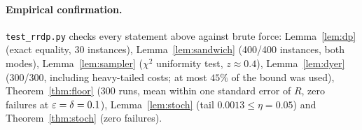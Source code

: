 \paragraph{Empirical confirmation.} \texttt{test\_rrdp.py} checks every statement above against brute force:
Lemma~\ref{lem:dp} (exact equality, 30 instances), Lemma~\ref{lem:sandwich} (400/400 instances,
both modes), Lemma~\ref{lem:sampler} ($\chi^2$ uniformity test, $z\approx0.4$), Lemma~\ref{lem:dyer} (300/300,
including heavy-tailed costs; at most $45\%$ of the bound was used), Theorem~\ref{thm:floor} (300 runs,
mean within one standard error of $R$, zero failures at $\varepsilon=\delta=0.1$), Lemma~\ref{lem:stoch} (tail
$0.0013\le\eta=0.05$) and Theorem~\ref{thm:stoch} (zero failures).
